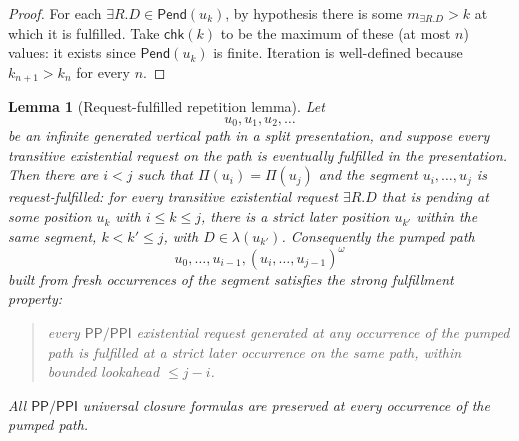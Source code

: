 \documentclass[11pt]{article}
\newtheorem{lemma}[theorem]{Lemma}
\newcommand{\PP}{\mathsf{PP}}
\newcommand{\PPI}{\mathsf{PPI}}
\begin{document}
\begin{proof}
For each $\exists R.D\in\mathsf{Pend}(u_k)$, by hypothesis there is
some $m_{\exists R.D}>k$ at which it is fulfilled.  Take
$\mathsf{chk}(k)$ to be the maximum of these (at most $n$) values:
it exists since $\mathsf{Pend}(u_k)$ is finite.  Iteration is
well-defined because $k_{n+1}>k_n$ for every $n$.
\end{proof}

\begin{lemma}[Request-fulfilled repetition lemma]\label{lem:request-cycle}
Let
\[
  u_0,u_1,u_2,\ldots
\]
be an infinite generated vertical path in a split presentation, and
suppose every transitive existential request on the path is
eventually fulfilled in the presentation.  Then there are $i<j$
such that $\Pi(u_i)=\Pi(u_j)$ and the segment $u_i,\ldots,u_j$ is
\emph{request-fulfilled}: for every transitive existential request
$\exists R.D$ that is pending at some position $u_k$ with
$i\le k\le j$, there is a strict later position $u_{k'}$ within
the same segment, $k<k'\le j$, with $D\in\lambda(u_{k'})$.
Consequently the pumped path
\[
  u_0,\ldots,u_{i-1},(u_i,\ldots,u_{j-1})^\omega
\]
built from fresh occurrences of the segment satisfies the strong
fulfillment property:
\begin{quote}
every $\PP/\PPI$ existential request generated at any occurrence
of the pumped path is fulfilled at a strict later occurrence on
the same path, within bounded lookahead $\le j-i$.
\end{quote}
All $\PP/\PPI$ universal closure formulas are preserved at every
occurrence of the pumped path.
\end{lemma}
\end{document}
